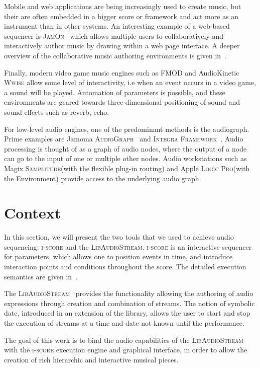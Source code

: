 \documentclass{article}
\newcommand*{\LibAudioStream}{\textsc{LibAudioStream}\xspace}
\newcommand*{\iscore}{\textsc{i-score}\xspace}
\newcommand*{\logic}{Apple \textsc{Logic Pro}\xspace}
\newcommand*{\samplitude}{Magix \textsc{Samplitude}\xspace}
\newcommand*{\jamomaaudiograph}{Jamoma \textsc{AudioGraph}\xspace}
\newcommand*{\integraframework}{\textsc{Integra Framework}\xspace}
\newcommand*{\jamon}{\textsc{JamOn}\xspace}
\newcommand*{\wwise}{AudioKinetic \textsc{Wwise}\xspace}
\newcommand*{\fmod}{\textsc{FMOD}\xspace}
\begin{document}
Mobile and web applications are being increasingly used to create music, 
but their are often embedded in a bigger score or framework and act more as an instrument than in other systems.
An interesting example of a web-based sequencer is \jamon~\cite{rosselet2013jam} which allows multiple users to collaboratively and interactively author music by drawing within a web page interface.
A deeper overview of the collaborative music authoring environments is given in~\cite{fencott2013computer}.

Finally, modern video game music engines such as \fmod and \wwise allow some level of interactivity, i.e when an event occurs in a video game, a sound will be played. 
Automation of parameters is possible, and these environments are geared towards three-dimensional positioning of sound and sound effects such as reverb, echo.

For low-level audio engines, one of the predominant methods is the audiograph.
Prime examples are \jamomaaudiograph~\cite{place2010jamoma} and \integraframework~\cite{bullock2011integra}.
Audio processing is thought of as a graph of audio nodes, where the output of a node can go to the input of one or multiple other nodes.
Audio workstations such as \samplitude (with the flexible plug-in routing) and \logic (with the Environment) provide access to the underlying audio graph.

\section{Context}
In this section, we will present the two tools that we used to achieve audio sequencing: \iscore and the \LibAudioStream.
\iscore is an interactive sequencer for parameters, which allows one to position events 
in time, and introduce interaction points and 
conditions throughout the score.
The detailed execution semantics are given in~\cite{celerier2015ossia}.

The \LibAudioStream~\cite{letzlibaudiostream} provides the functionality allowing the authoring of audio expressions through creation and combination of streams. The notion of symbolic date, introduced in an extension of the library,
allows the user to start and stop the execution of streams at a time and date not known until the performance.

The goal of this work is to bind the audio capabilities of the \LibAudioStream 
with the \iscore execution engine and graphical interface, in order to allow 
the creation of rich hierarchic and interactive musical pieces.
\end{document}
